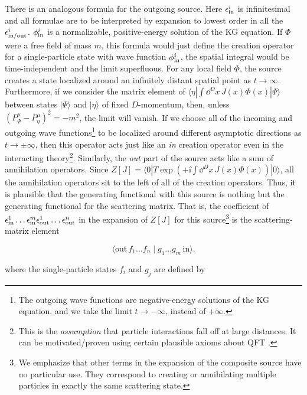 There is an analogous formula for the outgoing source. Here $\epsilon^i_{\rm in}$ is infinitesimal and
all formulae are to be interpreted by expansion to lowest order in all the $\epsilon^i_{\rm in/out}$. $\phi^i_{\rm in}$
is a normalizable, positive-energy solution of the KG equation. If $\Phi$ were a free field
of mass $m$, this formula would just define the creation operator for a single-particle
state with wave function $\phi^i_{\rm in}$, the spatial integral would be time-independent and the
limit superfluous. For any local field $\Phi$, the source creates a state localized around
an infinitely distant spatial point as $t\to\infty$. Furthermore, if we consider the matrix
element of $\langle\eta|\int\dd^D x\,J(x)\Phi(x)|\Psi\rangle$ between states $|\Psi\rangle$ and $|\eta\rangle$ of fixed $D$-momentum, then, unless
$(P^\mu_\Psi-P^\mu_\eta)^2=-m^2$, the limit will vanish. If we choose all of the incoming and outgoing
wave functions\footnote[11]{The outgoing wave functions are negative-energy solutions of the KG equation, and we take the limit $t\to-\infty$, instead of $+\infty$.} to be localized around different asymptotic directions as $t\to\pm\infty$,
then this operator acts just like an \emph{in} creation operator even in the interacting theory\footnote[12]{This is the \emph{assumption} that particle interactions fall off at large distances. It can be motivated/proven using certain plausible axioms about QFT \cite{banks-ref-21,banks-ref-22}.}.
Similarly, the \emph{out} part of the source acts like a sum of annihilation operators. Since
$Z[J]=\langle0|T\exp(+\ii\int\dd^D x\,J(x)\Phi(x))|0\rangle$, all the annihilation operators sit to the left of all of the
creation operators. Thus, it is plausible that the generating functional with this source is
nothing but the generating functional for the scattering matrix. That is, the coefficient of
$\epsilon^1_{\rm in}\ldots\epsilon^m_{\rm in}\epsilon^1_{\rm out}\ldots\epsilon^n_{\rm out}$ in the expansion of $Z[J]$ for this source\footnote[13]{We emphasize that other terms in the expansion of the composite source have no particular use. They correspond to creating or annihilating multiple particles in exactly the same scattering state.} is the scattering-matrix
element

\[
\langle \mathrm{out}\,f_1\ldots f_n\mid g_1\ldots g_m\,\mathrm{in}\rangle.
\]

where the single-particle states $f_i$ and $g_j$ are defined by

